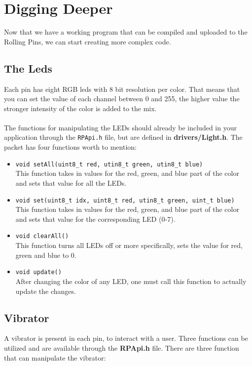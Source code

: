 \documentclass[a4paper, twoside, final]{book}%
\begin{document}
\newpage

\chapter{Digging Deeper}
Now that we have a working program that can be compiled and uploaded to the Rolling Pins, we can start creating more complex code.

\section{The Leds}
Each pin has eight RGB leds with 8 bit resolution per color. That means that you can set the value of each channel between 0 and 255, the higher value the stronger intensity of the color is added to the mix.\\
\\
The functions for manipulating the LEDs should already be included in your application through the \texttt{RPApi.h} file, but are defined in \textbf{drivers/Light.h}. The packet has four functions worth to mention:

\begin{itemize}
  \item \texttt{void setAll(uint8\_t red, utin8\_t green, utin8\_t blue)} \\
	  This function takes in values for the red, green, and blue part of the color and sets that value for all the LEDs.
  \item \texttt{void set(uint8\_t idx, uint8\_t red, utin8\_t green, uint\_t blue)}\\
	  This function takes in values for the red, green, and blue part of the color and sets that value for the corresponding LED (0-7).
  \item \texttt{void clearAll()}\\
    This function turns all LEDs off or more specifically, sets the value for red, green and blue to 0.
  \item \texttt{void update()}\\
    After changing the color of any LED, one must call this function to actually update the changes.
\end{itemize}

\section{Vibrator}
A vibrator is present in each pin, to interact with a user. Three functions can be utilized and are available through the \textbf{RPApi.h} file. There are three function that can manipulate the vibrator:
\end{document}
